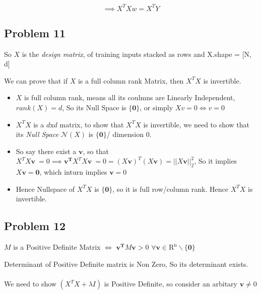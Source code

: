 \documentclass[12pt]{article}
\begin{document}
\begin{equation*}
    \implies X^T X w = X^T Y
\end{equation*}

\vspace{1em}


\subsection{Problem 11}

So $X$ is the \textit{design matrix}, of training inputs stacked as rows and X.shape = [N, d]


We can prove that if $X$ is a full column rank Matrix, then $X^TX$ is invertible.

\begin{itemize}
    \item $X$ is full column rank, means all its coulmns are Linearly Independent, $rank(X) = d$, So its Null Space is $\{\mathbf{0}\}$, or simply $Xv = 0 \iff v = 0$
    \item $X^TX$ is a $d\text{x}d$ matrix, to show that $X^TX$ is invertible, we need to show that its \textit{Null Space }$\mathcal{N}(X)$ is $\{\mathbf{0}\}$/ dimension 0.
    
    \item So say there exist a $\mathbf{v}$, so that $X^TX\mathbf{v}\ = 0 \implies \mathbf{v^T}X^TX\mathbf{v}\ = 0 = (X\mathbf{v})^T(X\mathbf{v}) = ||X\mathbf{v}||_2^2$, So it implies $X\mathbf{v} = \mathbf{0}$, which inturn implies $\mathbf{v} = 0$
    
    \item Hence Nullspace of $X^TX$ is $\{\mathbf{0}\}$, so it is full row/column rank. Hence $X^TX$ is invertible.
\end{itemize}

\vspace{0.5em}

\vspace{1em}


\subsection{Problem 12}

$M$ is a Positive Definite Matrix $\iff$ $\mathbf{v^T}M\mathbf{v} > 0$ $\forall \mathbf{v} \in \mathrm{R^n} \backslash \{\mathbf{0}\}$ 

Determinant of Positive Definite matrix is Non Zero, So its determinant exists.
\\
\\
We need to show $(X^TX + \lambda I)$ is Positive Definite, so consider an arbitary $\mathbf{v} \neq 0$
\end{document}
